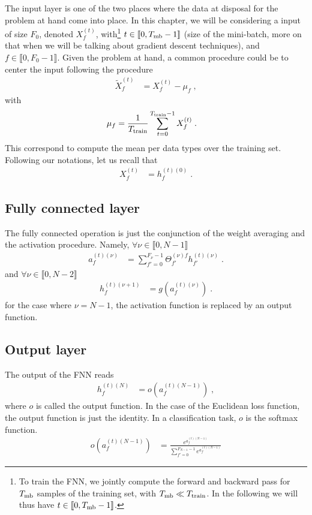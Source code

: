 The input layer is one of the two places where the data at disposal for the problem at hand come into place. In this chapter, we will be considering a input of size $F_0$, denoted $X^{(t)}_{f}$, with\footnote{
To train the FNN, we jointly compute the forward and backward pass for $T_{{\rm mb}}$ samples of the training set, with $T_{{\rm mb}}\ll T_{{\rm train}}$. In the following we will thus have $t\in \llbracket 0, T_{{\rm mb}}-1\rrbracket$.
}
 $t\in \llbracket 0, T_{{\rm mb}}-1\rrbracket$ (size of the mini-batch, more on that when we will be talking about gradient descent techniques), and $f \in \llbracket 0, F_0-1\rrbracket$. Given the problem at hand, a common procedure could be to center the input following the procedure
\begin{align}
\tilde{X}^{(t)}_{f}&=X^{(t)}_{f}-\mu_{f}\;,
\end{align}
with
\begin{align}
\mu_{f}&=\frac{1}{T_{{\rm train}}}\sum^{T_{{\rm train}}-1}_{t=0}X^{(t)}_{f}\;.
\end{align}
This correspond to compute the mean per data types over the training set. Following our notations, let us recall that
\begin{align}
X^{(t)}_{f}&=h^{(t)(0)}_{f}\;.
\end{align}

\subsection{Fully connected layer}

The fully connected operation is just the conjunction of the weight averaging and the activation procedure. Namely, $\forall \nu\in \llbracket 0,N-1 \rrbracket$
\begin{align}
a_{f}^{(t)(\nu)}&=\sum^{F_\nu-1}_{f'=0}\Theta^{(\nu)f}_{f'}h^{(t)(\nu)}_{f'}\;.\label{eq:Weightavg}
\end{align}
and $\forall \nu\in \llbracket 0,N-2 \rrbracket$
\begin{align}
h_{f}^{(t)(\nu+1)}&=g\left(a_{f}^{(t)(\nu)}\right)\;.
\end{align}
for the case where $\nu=N-1$, the activation function is replaced by an output function.



\subsection{Output layer}

The output of the FNN reads
 \begin{align}
h_{f}^{(t)(N)}&=o(a_{f}^{(t)(N-1)})\;,
\end{align}
where $o$ is called the output function. In the case of the Euclidean loss function, the output function is just the identity. In a classification task, $o$ is the softmax function.
\begin{align}
o\left(a^{(t)(N-1)}_f\right)&=\frac{e^{a^{(t)(N-1)}_f}}{\sum\limits^{F_{N-1}-1}_{f'=0}e^{a^{(t)(N-1)}_{f'}}}
\end{align}


